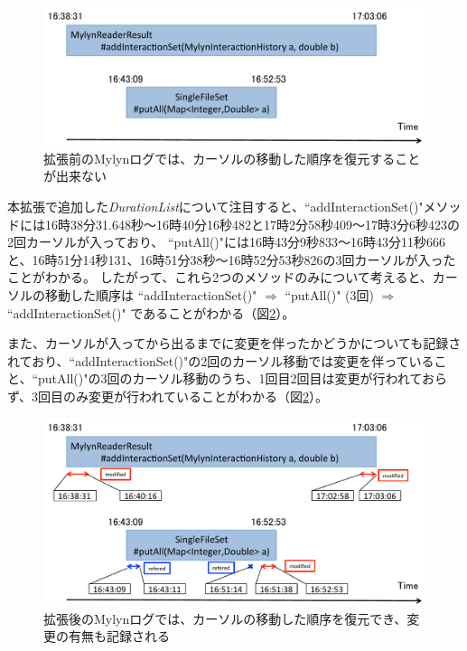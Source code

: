 \documentclass[a4paper]{jsbook}
\def\Ra{\Rightarrow}
\begin{document}
\begin{figure}[tb]
  \centering
  \includegraphics[width = \linewidth]{resource/only_startdate_enddate.pdf}
  \caption{拡張前のMylynログでは、カーソルの移動した順序を復元することが出来ない}
  \label{only_startdate_enddate}
\end{figure}


本拡張で追加した{\it DurationList}について注目すると、``addInteractionSet()"メソッドには16時38分31.648秒〜16時40分16秒482と17時2分58秒409〜17時3分6秒423の2回カーソルが入っており、
``putAll()"には16時43分9秒833〜16時43分11秒666と、16時51分14秒131、16時51分38秒〜16時52分53秒826の3回カーソルが入ったことがわかる。
したがって、これら2つのメソッドのみについて考えると、カーソルの移動した順序は
``addInteractionSet()" $\Ra$
``putAll()" (3回) $\Ra$
``addInteractionSet()"
であることがわかる（図\ref{with_durationlist}）。

また、カーソルが入ってから出るまでに変更を伴ったかどうかについても記録されており、``addInteractionSet()"の2回のカーソル移動では変更を伴っていること、``putAll()"の3回のカーソル移動のうち、1回目2回目は変更が行われておらず、3回目のみ変更が行われていることがわかる（図\ref{with_durationlist}）。

\begin{figure}[tb]
  \centering
  \includegraphics[width = \linewidth]{resource/with_durationlist.pdf}
  \caption{拡張後のMylynログでは、カーソルの移動した順序を復元でき、変更の有無も記録される}
  \label{with_durationlist}
\end{figure}
\end{document}
